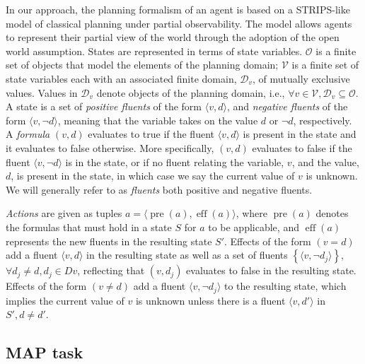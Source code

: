 \documentclass[12pt]{article}
\DeclareMathOperator{\pre}{pre}
\DeclareMathOperator{\eff}{eff}
\begin{document}
In our approach, the planning formalism of an agent is based on a STRIPS-like model of classical planning under partial observability.
The model allows agents to represent their partial view of the world through the adoption of the open world assumption.
States are represented in terms of state variables.
$\mathcal{O}$ is a finite set of objects that model the elements of the planning domain; $\mathcal{V}$ is a finite set of state variables each with an associated finite domain, $\mathcal{D}_v$, of mutually exclusive values.
Values in $\mathcal{D}_v$ denote objects of the planning domain, i.e., $\forall v \in \mathcal{V}, \mathcal{D}_v \subseteq \mathcal{O}$.
A state is a set of \textit{positive fluents} of the form $\langle v,d\rangle$, and \textit{negative fluents} of the form $\langle v,\neg d\rangle$, meaning that the variable takes on the value $d$ or $\neg d$, respectively.
A \textit{formula} $(v, d)$ evaluates to true if the fluent $\langle v,d\rangle$ is present in the state and it evaluates to false otherwise.
More specifically, $(v, d)$ evaluates to false if the fluent $\langle v,\neg d\rangle$ is in the state, or if no fluent relating the variable, $v$, and the value, $d$, is present in the state, in which case we say the current value of $v$ is unknown.
We will generally refer to as \textit{fluents} both positive and negative fluents.

\textit{Actions} are given as tuples $a = \langle \pre(a),\eff(a)\rangle$, where $\pre(a)$ denotes the formulas that must hold in a state $S$ for $a$ to be applicable, and $\eff(a)$ represents the new fluents in the resulting state $S'$.
Effects of the form $(v = d)$ add a fluent $\langle v,d\rangle$ in the resulting state as well as a set of fluents $\left\{ \langle v,\neg d_j\rangle \right\}$, $\forall d_j \neq d, d_j \in Dv$, reflecting that $(v, d_j)$ evaluates to false in the resulting state.
Effects of the form $(v \neq d)$ add a fluent $\langle v,\neg d_j\rangle$ to the resulting state, which implies the current value of $v$ is unknown unless there is a fluent $\langle v,d'\rangle$ in $S', d \neq d'$.

\subsection{MAP task}
\end{document}
